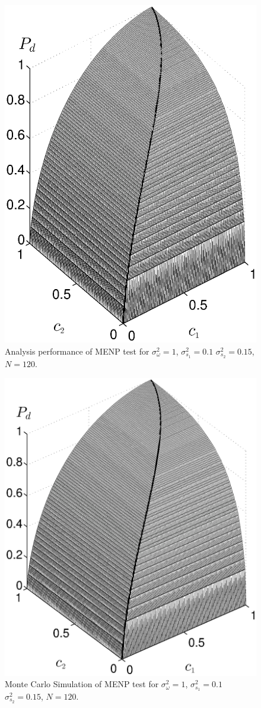 \documentclass[12pt,journal,a4paper,twoside,onecolumn]{IEEEtran}
\begin{document}
\begin{spacing}{2.5}
\begin{figure}[!t]
\centering
\includegraphics[width=12cm]{simu_chi2ROC.eps}
\caption{Analysis performance of MENP test for $\sigma_\omega^2=1$, $\sigma_{s_1}^2=0.1$ $\sigma_{s_2}^2 = 0.15$, $N=120$.}
\label{317}
\end{figure}

\begin{figure}[!t]
\centering
\includegraphics[width=12cm]{simu_c.eps}
\caption{Monte Carlo Simulation of MENP test for $\sigma_\omega^2=1$, $\sigma_{s_1}^2=0.1$ $\sigma_{s_2}^2 = 0.15$, $N=120$.}
\label{pic: simulation result}
\end{figure}

\end{spacing}
\end{document}

